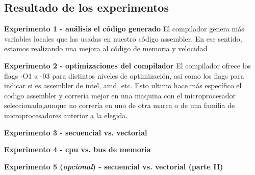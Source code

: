 \subsection{Resultado de los experimentos}

\vspace*{0.3cm} \noindent
\textbf{Experimento 1 - análisis el código generado}
El compilador genera más variables locales que las usadas en nuestro c\'odigo assembler. En ese sentido, estamos realizando una mejora al c\'odigo de memoria y velocidad


\vspace*{0.3cm} \noindent
\textbf{Experimento 2 - optimizaciones del compilador}
El compilador ofrece los flags -O1 a -03 para distintos niveles de optimizaci\'on, asi como los flags para indicar si es assembler de intel, amd, etc. 
Esto ultimo hace m\'as espec\'ifico el codigo assembler y correr\'ia mejor en una maquina con el microprocesador seleccionado,aunque no correr\'ia en uno de otra marca o de una familia de microprocesadores anterior a la elegida.

\vspace*{0.3cm} \noindent
\textbf{Experimento 3 - secuencial vs. vectorial}

\vspace*{0.3cm} \noindent
\textbf{Experimento 4 - cpu vs. bus de memoria}

\vspace*{0.3cm} \noindent
\textbf{Experimento 5 (\textit{opcional}) - secuencial vs. vectorial (parte II)}
